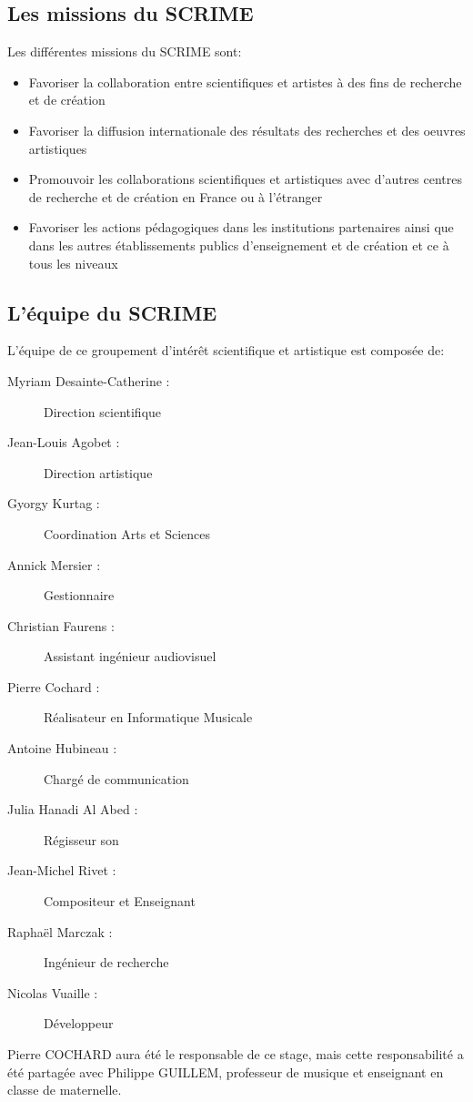 \documentclass[a4paper, 12pt]{report}
\begin{document}
\subsection{Les missions du SCRIME}
Les différentes missions du SCRIME \cite{SCRIME2016} sont:
\begin{itemize}
\item Favoriser la collaboration entre scientifiques et artistes à des fins de recherche et de création
\item Favoriser la diffusion internationale des résultats des recherches et des oeuvres artistiques
\item Promouvoir les collaborations scientifiques et artistiques avec d'autres centres de recherche et de création en France ou à l'étranger
\item Favoriser les actions pédagogiques dans les institutions partenaires ainsi que dans les autres établissements publics d'enseignement et de création et ce à tous les niveaux 
\end{itemize}

\subsection{L'équipe du SCRIME}
L'équipe de ce groupement d'intérêt scientifique et artistique est composée de:
\begin{description}
\item[Myriam Desainte-Catherine :] Direction scientifique
\item[Jean-Louis Agobet :] Direction artistique
\item[Gyorgy Kurtag :] Coordination Arts et Sciences
\item[Annick Mersier :] Gestionnaire
\item[Christian Faurens :] Assistant ingénieur audiovisuel
\item[Pierre Cochard :] Réalisateur en Informatique Musicale
\item[Antoine Hubineau :] Chargé de communication
\item[Julia Hanadi Al Abed :] Régisseur son
\item[Jean-Michel Rivet :] Compositeur et Enseignant
\item[Raphaël Marczak :] Ingénieur de recherche
\item[Nicolas Vuaille :] Développeur
\end{description}
Pierre COCHARD aura été le responsable de ce stage, mais cette responsabilité a été partagée avec Philippe GUILLEM, professeur de musique et enseignant en classe de maternelle.
\end{document}
